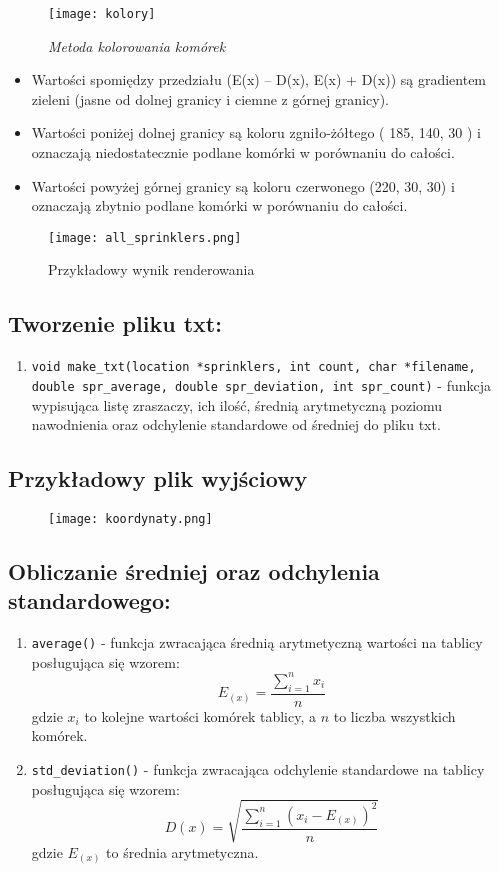 \documentclass[a4paper]{article}
\begin{document}
\begin{figure}[H]
    \texttt{[image: kolory]}
    \centering
    \caption{\textit{Metoda kolorowania komórek}}
\end{figure}

\begin{itemize}
    \item Wartości spomiędzy przedziału (E(x) – D(x), E(x) + D(x)) są gradientem zieleni (jasne od dolnej granicy i ciemne z górnej granicy).
    \item Wartości poniżej dolnej granicy są koloru zgniło-żółtego ( 185, 140, 30 ) i oznaczają niedostatecznie podlane komórki w porównaniu do całości.
    \item Wartości powyżej górnej granicy są koloru czerwonego (220, 30, 30) i oznaczają zbytnio podlane komórki w porównaniu do całości.
\end{itemize}

\begin{figure}[H]
    \texttt{[image: all\_sprinklers.png]}
    \centering
    \caption{Przykładowy wynik renderowania}
\end{figure}
\newpage
\subsection{Tworzenie pliku txt:}
\begin{enumerate}
    \item \texttt{void make_txt(location *sprinklers, int count, char *filename,
    double spr_average, double spr_deviation, int spr_count)} - funkcja wypisująca listę zraszaczy, ich ilość, średnią arytmetyczną poziomu nawodnienia oraz odchylenie standardowe od średniej do pliku txt.
\end{enumerate}

\subsection*{Przykładowy plik wyjściowy}
\begin{figure}[H]
	\texttt{[image: koordynaty.png]}
	\centering
\end{figure}

\subsection{Obliczanie średniej oraz odchylenia standardowego:}


\begin{enumerate}
    \item \texttt{average()} - funkcja zwracająca średnią arytmetyczną wartości na tablicy posługująca się 	wzorem:
          \[E_{(x)} = \frac{\sum_{i=1}^n x_i}{n}\]
          gdzie $x_i$ to kolejne wartości komórek tablicy, a $n$ to liczba wszystkich komórek.

    \item \texttt{std_deviation()} - funkcja zwracająca odchylenie standardowe na tablicy posługująca się 	wzorem:
          \[D(x) = \sqrt{\frac{\sum_{i=1}^n (x_i - E_{(x)})^2 }{n}}\]
          gdzie \(E_{(x)}\) to średnia arytmetyczna.
\end{enumerate}
\end{document}
